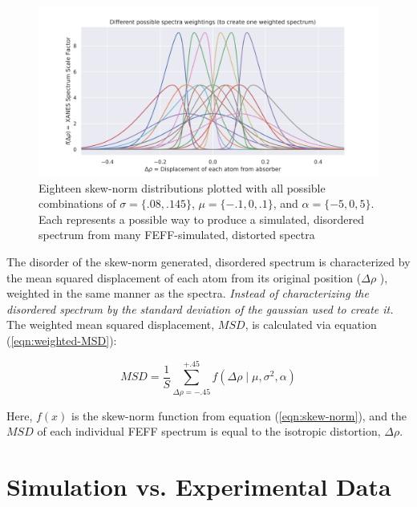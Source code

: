 \begin{figure}[h!]
	\centering
	\includegraphics[width=\linewidth]{Chapters/Figures/skewnorm_options.png}
	\caption[Simulated Disordered Spectrum Weightings]{Eighteen skew-norm distributions plotted with all possible combinations of $ \sigma=\{.08, .145\} $, $ \mu=\{-.1, 0, .1\} $, and $ \alpha=\{-5,0,5\} $. Each represents a possible way to produce a simulated, disordered spectrum from many FEFF-simulated, distorted spectra} 
	\label{fig:skew-norm-options}
\end{figure}

The disorder of the skew-norm generated, disordered spectrum is characterized by the mean squared displacement of each atom from its original position ($ \Delta\rho $ ), weighted in the same manner as the spectra. \textit{Instead of characterizing the disordered spectrum by the standard deviation of the gaussian used to create it.} The weighted mean squared displacement, $ MSD $, is calculated via equation (\ref{eqn:weighted-MSD}):

\begin{equation}
	\label{eqn:weighted-MSD}
	MSD  = \frac{1}{S} \sum_{\Delta\rho=-.45}^{+.45} f\left(\Delta \rho \mid \mu, \sigma^2, \alpha \right) 
\end{equation}

\noindent
Here, $ f(x) $ is the skew-norm function from equation (\ref{eqn:skew-norm}), and the $ MSD $  of each individual FEFF spectrum is equal to the isotropic distortion, $ \Delta\rho $.  

\section{Simulation vs. Experimental Data} \label{sec:end-disorder}

